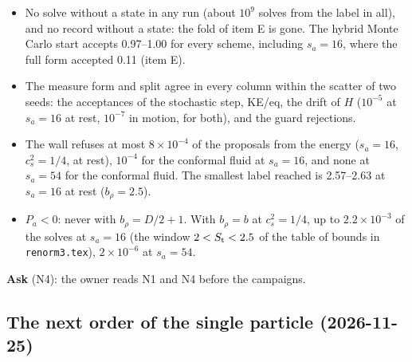 \documentclass[11pt,aps,preprint,nofootinbib,superscriptaddress,tightenlines]{revtex4-2}
\begin{document}
\begin{itemize}
\item No solve without a state in any run (about $10^9$ solves from the label in all), and no record without a state: the fold of item E is gone.
  The hybrid Monte Carlo start accepts 0.97--1.00 for every scheme, including $s_a=16$, where the full form accepted 0.11 (item E).
\item The measure form and split agree in every column within the scatter of two seeds: the acceptances of the stochastic step, KE/eq, the drift of
  $H$ ($10^{-5}$ at $s_a=16$ at rest, $10^{-7}$ in motion, for both), and the guard rejections.
\item The wall refuses at most $8\times10^{-4}$ of the proposals from the energy ($s_a=16$, $c_s^2=1/4$, at rest), $10^{-4}$ for the conformal fluid at
  $s_a=16$, and none at $s_a=54$ for the conformal fluid.  The smallest label reached is 2.57--2.63 at $s_a=16$ at rest ($b_\rho=2.5$).
\item $P_a<0$: never with $b_\rho=D/2+1$.  With $b_\rho=b$ at $c_s^2=1/4$, up to $2.2\times10^{-3}$ of the solves at $s_a=16$ (the window
  $2<S_{\rm t}<2.5$ of the table of bounds in \nolinkurl{renorm3.tex}), $2\times10^{-6}$ at $s_a=54$.
\end{itemize}
\textbf{Ask} (N4): the owner reads N1 and N4 before the campaigns.

\subsection*{The next order of the single particle (2026-11-25)}
\end{document}
